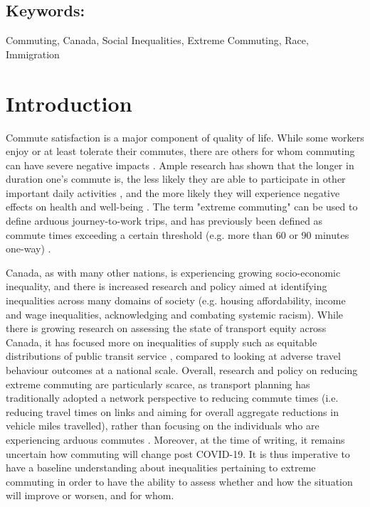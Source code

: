 \documentclass[10 pt,letterpaper]{article}
\begin{document}
	
	
	\subsection*{{Keywords:}}
	\vspace{-5mm}
	Commuting, Canada, Social Inequalities, Extreme Commuting, Race, Immigration
	
	\normalsize
	


\vspace{4mm}

\vspace{4mm}



	


\newpage

\section{Introduction}

Commute satisfaction is a major component of quality of life. While some workers enjoy or at least tolerate their commutes, there are others for whom commuting can have severe negative impacts \cite{novaco_transportation_1979,chatterjee_commuting_2020}. Ample research has shown that the longer in duration one's commute is, the less likely they are able to participate in other important daily activities \cite{farber_running_2011, hilbrecht_highway_2014}, and the more likely they will experience negative effects on health and well-being \cite{morris_are_2015,st-louis_happy_2014}. The term "extreme commuting" can be used to define arduous journey-to-work trips, and has previously been defined as commute times exceeding a certain threshold (e.g. more than 60 or 90 minutes one-way) \cite{marion_comparison_2007,maoh_determinants_2012-1,vincent-geslin_determinants_2016,bai_exploring_2020}.

Canada, as with many other nations, is experiencing growing socio-economic inequality, and there is increased research and policy aimed at identifying inequalities across many domains of society (e.g. housing affordability, income and wage inequalities, acknowledging and combating systemic racism). While there is growing research on assessing the state of transport equity across Canada, it has focused more on inequalities of supply such as equitable distributions of public transit service \cite{deboosere_evaluating_2018,allen_sizing_2019}, compared to looking at adverse travel behaviour outcomes at a national scale. Overall, research and policy on reducing extreme commuting are particularly scarce, as transport planning has traditionally adopted a network perspective to reducing commute times (i.e. reducing travel times on links and aiming for overall aggregate reductions in vehicle miles travelled), rather than focusing on the individuals who are experiencing arduous commutes \cite{martens_transport_2016}. Moreover, at the time of writing, it remains uncertain how commuting will change post COVID-19. It is thus imperative to have a baseline understanding about inequalities pertaining to extreme commuting in order to have the ability to assess whether and how the situation will improve or worsen, and for whom.
\end{document}

